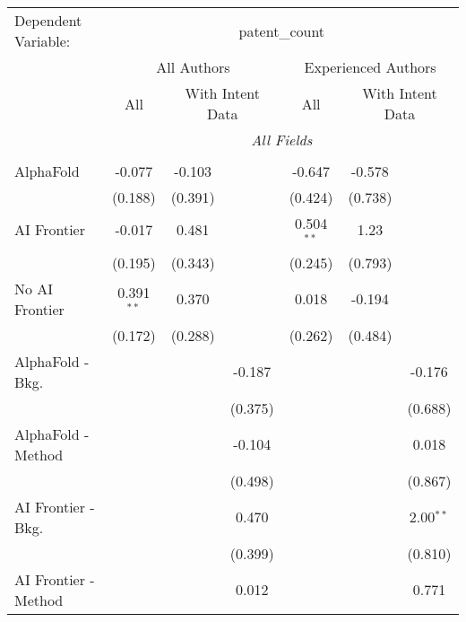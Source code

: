 \begingroup
\centering
\begin{tabular}{lcccccc}
   \tabularnewline \midrule \midrule
   Dependent Variable: & \multicolumn{6}{c}{patent\_count}\\
 & \multicolumn{3}{c}{All Authors} & \multicolumn{3}{c}{Experienced Authors} \\
\cmidrule(lr){2-4} \cmidrule(lr){5-7}
 & \multicolumn{1}{c}{All} & \multicolumn{2}{c}{With Intent Data} & \multicolumn{1}{c}{All} & \multicolumn{2}{c}{With Intent Data} \\
\cmidrule(lr){2-2} \cmidrule(lr){3-4} \cmidrule(lr){5-5} \cmidrule(lr){6-7}
 & \multicolumn{6}{c}{\textit{All Fields}} \\ \\
   AlphaFold               & -0.077       & -0.103  &              & -0.647       & -0.578  &   \\   
                           & (0.188)      & (0.391) &              & (0.424)      & (0.738) &   \\   
   AI Frontier             & -0.017       & 0.481   &              & 0.504$^{**}$ & 1.23    &   \\   
                           & (0.195)      & (0.343) &              & (0.245)      & (0.793) &   \\   
   No AI Frontier          & 0.391$^{**}$ & 0.370   &              & 0.018        & -0.194  &   \\   
                           & (0.172)      & (0.288) &              & (0.262)      & (0.484) &   \\   
   AlphaFold - Bkg.        &              &         & -0.187       &              &         & -0.176\\   
                           &              &         & (0.375)      &              &         & (0.688)\\   
   AlphaFold - Method      &              &         & -0.104       &              &         & 0.018\\   
                           &              &         & (0.498)      &              &         & (0.867)\\   
   AI Frontier - Bkg.      &              &         & 0.470        &              &         & 2.00$^{**}$\\   
                           &              &         & (0.399)      &              &         & (0.810)\\   
   AI Frontier - Method    &              &         & 0.012        &              &         & 0.771\\   

\end{tabular}
